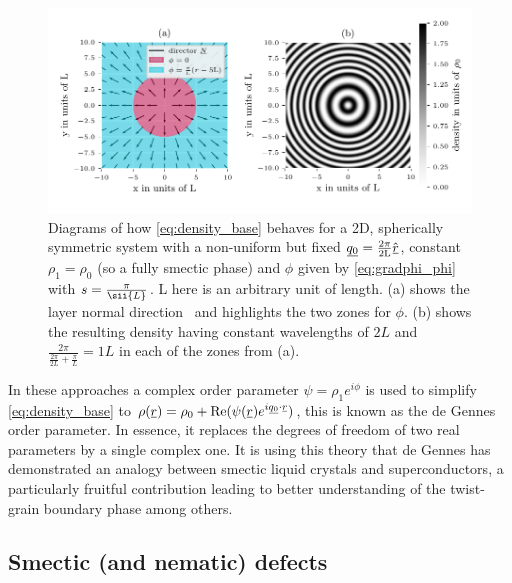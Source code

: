 \documentclass[12pt]{article}
\newcommand{\suf}[2]{\stackunder[0.5pt]{\stackunder[1pt]{\ensuremath{#1}}{\rule{\widthof{\ensuremath{#2}}*\real{0.9}}{.1ex}}}{}}
\newcommand{\su}[1]{\suf{#1}{#1}}
\newcommand{\ssu}[1]{\scriptsize\su{#1}\normalsize}
\newcommand{\NN}{\su{N}}
\begin{document}
\begin{figure}[t]
    \begin{center}
        \includegraphics{figures/misc/wave_phi_example.pdf}
    \end{center}
    \caption{
        Diagrams of how \cref{eq:density_base} behaves for a 2D, spherically symmetric system with a non-uniform but fixed $\su{q_0} = \frac{2\pi}{2\si{L}}\hat{\su{r}}$, constant $\rho_1 = \rho_0$ (so a fully smectic phase) and $\phi$ given by \cref{eq:gradphi_phi} with $s=\frac{\pi}{\sii{L}}$.
        \si{L} here is an arbitrary unit of length.
        (a) shows the layer normal direction \NN\ and highlights the two zones for $\phi$.
        (b) shows the resulting density having constant wavelengths of $2\si{L}$ and $\frac{2\pi}{\frac{2\pi}{2\si{L}}+\frac{\pi}{\si{L}}} = 1\si{L}$ in each of the zones from (a).
    }\label{fig:gradphi}
\end{figure}

In these approaches a complex order parameter $\psi=\rho_1e^{i\phi}$ is used to simplify \cref{eq:density_base} to $\rho(\su{r}) = \rho_0 + \Re(\psi(\su{r}) e^{i\ssu{q_0}\cdot\ssu{r}})$, this is known as the de Gennes order parameter.
In essence, it replaces the degrees of freedom of two real parameters by a single complex one.
It is using this theory that de Gennes has demonstrated an analogy between smectic liquid crystals and superconductors\cite{degennesAnalogySuperconductorsSmectics1972}, a particularly fruitful contribution leading to better understanding of the twist-grain boundary phase\cite{lubenskyTwistgrainboundaryPhasesNematic1990} among others.

\subsection{Smectic (and nematic) defects}
\end{document}
